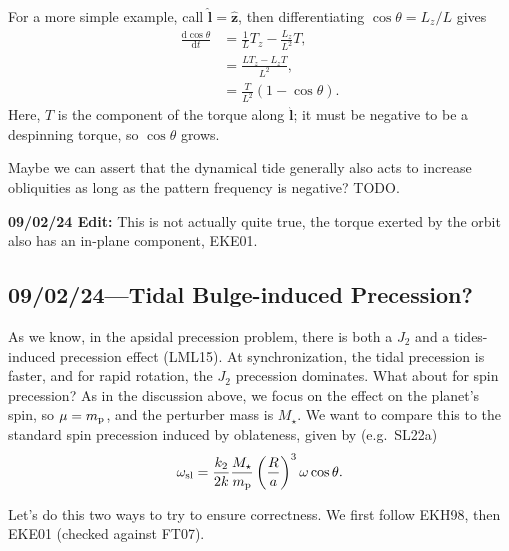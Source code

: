\documentclass[12pt]{article}
\newcommand*{\rd}[2]{\frac{\mathrm{d}#1}{\mathrm{d}#2}}
\newcommand*{\bm}[1]{\boldsymbol{\mathbf{#1}}}
\newcommand*{\uv}[1]{\hat{\bm{#1}}}
\newcommand*{\p}[1]{\left(#1\right)}
\begin{document}
For a more simple example, call $\uv{l} = \uv{z}$, then differentiating
$\cos\theta = L_z / L$ gives
\begin{align}
    \rd{\cos\theta}{t} &= \frac{1}{L}T_z - \frac{L_z}{L^2}T,\\
        &= \frac{LT_z - L_zT}{L^2},\\
        &= \frac{T}{L^2}\p{1 - \cos\theta}.
\end{align}
Here, $T$ is the component of the torque along $\uv{l}$; it must be negative to
be a despinning torque, so $\cos\theta$ grows.

Maybe we can assert that the dynamical tide generally also acts to increase
obliquities as long as the pattern frequency is negative? TODO\@.

\textbf{09/02/24 Edit:} This is not actually quite true, the torque exerted by
the orbit also has an in-plane component, EKE01.

\subsection{09/02/24---Tidal Bulge-induced Precession?}

As we know, in the apsidal precession problem, there is both a $J_2$ and a
tides-induced precession effect (LML15). At synchronization, the tidal
precession is faster, and for rapid rotation, the $J_2$ precession dominates.
What about for spin precession? As in the discussion above, we focus on the
effect on the planet's spin, so $\mu = m_{\rm p}$, and the perturber mass is
$M_\star$. We want to compare this to the standard spin precession induced by
oblateness, given by (e.g.\ SL22a)
\begin{equation}
    \omega_{\rm sl}
        = \frac{k_2}{2k}\frac{M_\star}{m_{\rm p}}\p{\frac{R}{a}}^3
            \omega \cos \theta.
\end{equation}

Let's do this two ways to try to ensure correctness. We first follow EKH98, then
EKE01 (checked against FT07).
\end{document}
